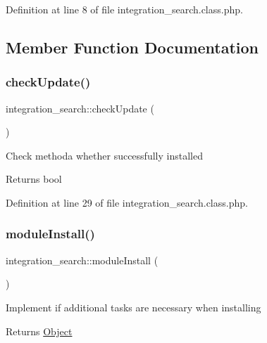 Definition at line 8 of file integration\+\_\+search.\+class.\+php.



\subsection{Member Function Documentation}
\hypertarget{classintegration__search_a998b55202e7ea75389e2ab8f640b374d}{}\label{classintegration__search_a998b55202e7ea75389e2ab8f640b374d} 
\subsubsection{\texorpdfstring{check\+Update()}{checkUpdate()}}
{\footnotesize\ttfamily integration\+\_\+search\+::check\+Update (\begin{DoxyParamCaption}{ }\end{DoxyParamCaption})}

Check methoda whether successfully installed

\begin{DoxyReturn}{Returns}
bool 
\end{DoxyReturn}


Definition at line 29 of file integration\+\_\+search.\+class.\+php.

\hypertarget{classintegration__search_a04d168bf88a4f95b6f4bd24854538d87}{}\label{classintegration__search_a04d168bf88a4f95b6f4bd24854538d87} 
\subsubsection{\texorpdfstring{module\+Install()}{moduleInstall()}}
{\footnotesize\ttfamily integration\+\_\+search\+::module\+Install (\begin{DoxyParamCaption}{ }\end{DoxyParamCaption})}

Implement if additional tasks are necessary when installing

\begin{DoxyReturn}{Returns}
\hyperlink{classObject}{Object} 
\end{DoxyReturn}


